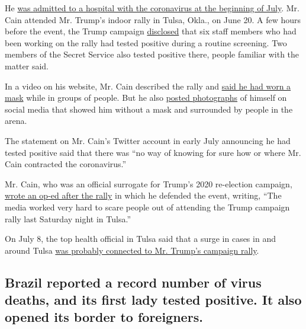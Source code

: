 He
\href{https://www.nytimes.com/2020/07/02/us/politics/herman-cain-coronavirus.html}{was
admitted to a hospital with the coronavirus at the beginning of July}.
Mr. Cain attended Mr. Trump's indoor rally in Tulsa, Okla., on June 20.
A few hours before the event, the Trump campaign
\href{https://www.nytimes.com/2020/06/20/us/politics/tulsa-trump-rally.html?searchResultPosition=64}{disclosed}
that six staff members who had been working on the rally had tested
positive during a routine screening. Two members of the Secret Service
also tested positive there, people familiar with the matter said.

In a video on his website, Mr. Cain described the rally and
\href{https://hermancain.com/trump-tulsa-rally-i-was-there/?utm_source=twitter\&utm_medium=thenewvoice\&utm_content=2020-06-22}{said
he had worn a mask} while in groups of people. But he also
\href{https://twitter.com/THEHermanCain/status/1274489632886075398?s=20}{posted
photographs} of himself on social media that showed him without a mask
and surrounded by people in the arena.

The statement on Mr. Cain's Twitter account in early July announcing he
had tested positive said that there was ``no way of knowing for sure how
or where Mr. Cain contracted the coronavirus.''

Mr. Cain, who was an official surrogate for Trump's 2020 re-election
campaign,
\href{https://www.westernjournal.com/herman-cain-tulsa-trump-rally-crowd-huge-enthusiastic/?utm_source=Twitter\&utm_medium=PostTopSharingButtons\&utm_campaign=websitesharingbuttons}{wrote
an op-ed after the rally} in which he defended the event, writing, ``The
media worked very hard to scare people out of attending the Trump
campaign rally last Saturday night in Tulsa.''

On July 8, the top health official in Tulsa said that a surge in cases
in and around Tulsa
\href{https://www.nytimes.com/2020/07/08/us/politics/coronavirus-tulsa-trump-rally.html}{was
probably connected to Mr. Trump's campaign rally}.

\hypertarget{brazil-reported-a-record-number-of-virus-deaths-and-its-first-lady-tested-positive-it-also-opened-its-border-to-foreigners}{%
\subsection{Brazil reported a record number of virus deaths, and its
first lady tested positive. It also opened its border to
foreigners.}\label{brazil-reported-a-record-number-of-virus-deaths-and-its-first-lady-tested-positive-it-also-opened-its-border-to-foreigners}}

